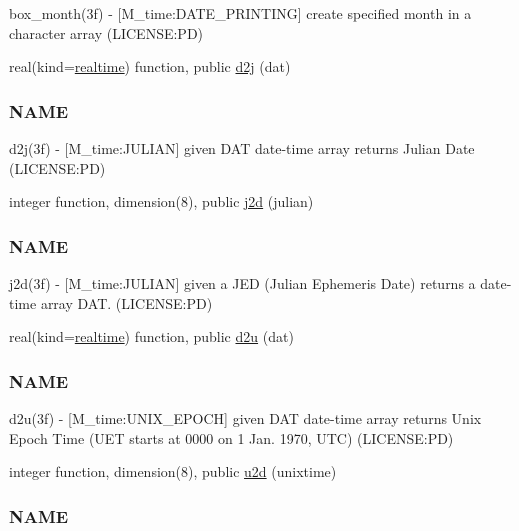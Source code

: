 \begin{DoxyCompactItemize}
\begin{DoxyCompactList}
box\+\_\+month(3f) -\/ \mbox{[}M\+\_\+time\+:D\+A\+T\+E\+\_\+\+P\+R\+I\+N\+T\+I\+NG\mbox{]} create specified month in a character array (L\+I\+C\+E\+N\+SE\+:PD) \end{DoxyCompactList}\item 
real(kind=\mbox{\hyperlink{namespacem__time_ac10ea9e8d59ec74eaa7d89f2517d7422}{realtime}}) function, public \mbox{\hyperlink{namespacem__time_a3fccc53c2650104eff084c7998d18f54}{d2j}} (dat)
\begin{DoxyCompactList}\small\item\em \subsubsection*{N\+A\+ME}

d2j(3f) -\/ \mbox{[}M\+\_\+time\+:J\+U\+L\+I\+AN\mbox{]} given D\+AT date-\/time array returns Julian Date (L\+I\+C\+E\+N\+SE\+:PD) \end{DoxyCompactList}\item 
integer function, dimension(8), public \mbox{\hyperlink{namespacem__time_a3ad5cad6df02c53e0429c3602a072e3c}{j2d}} (julian)
\begin{DoxyCompactList}\small\item\em \subsubsection*{N\+A\+ME}

j2d(3f) -\/ \mbox{[}M\+\_\+time\+:J\+U\+L\+I\+AN\mbox{]} given a J\+ED (Julian Ephemeris Date) returns a date-\/time array D\+AT. (L\+I\+C\+E\+N\+SE\+:PD) \end{DoxyCompactList}\item 
real(kind=\mbox{\hyperlink{namespacem__time_ac10ea9e8d59ec74eaa7d89f2517d7422}{realtime}}) function, public \mbox{\hyperlink{namespacem__time_a1506e2889a156387df4481ed0534be81}{d2u}} (dat)
\begin{DoxyCompactList}\small\item\em \subsubsection*{N\+A\+ME}

d2u(3f) -\/ \mbox{[}M\+\_\+time\+:U\+N\+I\+X\+\_\+\+E\+P\+O\+CH\mbox{]} given D\+AT date-\/time array returns Unix Epoch Time (U\+ET starts at 0000 on 1 Jan. 1970, U\+TC) (L\+I\+C\+E\+N\+SE\+:PD) \end{DoxyCompactList}\item 
integer function, dimension(8), public \mbox{\hyperlink{namespacem__time_a083bc231f8ba1879d7f86ab424e77d6c}{u2d}} (unixtime)
\begin{DoxyCompactList}\small\item\em \subsubsection*{N\+A\+ME}


\end{DoxyCompactList}
\end{DoxyCompactItemize}
